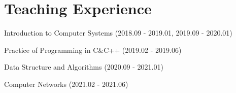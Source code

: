 \documentclass[letterpaper]{article}
\renewenvironment{itemize}{
  \begin{list}{}{
    \setlength{\leftmargin}{1.5em}
  }
}{
  \end{list}
}
\begin{document}
\section*{Teaching Experience}
\begin{itemize}
    \item Introduction to Computer Systems  (2018.09 - 2019.01, 2019.09 - 2020.01)
    \item Practice of Programming in C\&C++ (2019.02 - 2019.06)
    \item Data Structure and Algorithms (2020.09 - 2021.01)
    \item Computer Networks (2021.02 - 2021.06)
\end{itemize}
	



    
\end{document}
